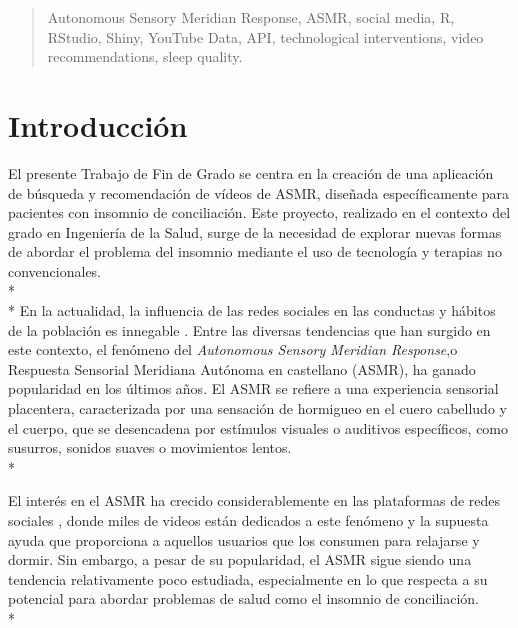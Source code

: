 \documentclass[a4paper,12pt,twoside]{memoir}
\begin{document}
\renewcommand*\abstractname{Keywords}
\begin{abstract}
Autonomous Sensory Meridian Response, ASMR, social media, R, RStudio, Shiny, YouTube Data, API, technological interventions, video recommendations, sleep quality.
\end{abstract}

\clearpage

\tableofcontents

\clearpage

\listoffigures

\clearpage

\listoftables
\clearpage


\mainmatter








\chapter{Introducción}

El presente Trabajo de Fin de Grado se centra en la creación de una aplicación de búsqueda y recomendación de vídeos de ASMR, diseñada específicamente para pacientes con insomnio de conciliación. Este proyecto, realizado en el contexto del grado en Ingeniería de la Salud, surge de la necesidad de explorar nuevas formas de abordar el problema del insomnio mediante el uso de tecnología y terapias no convencionales.\\*\\*
En la actualidad, la influencia de las redes sociales en las conductas y hábitos de la población es innegable \cite{levenson2016}. Entre las diversas tendencias que han surgido en este contexto, el fenómeno del \textit{Autonomous Sensory Meridian Response},o Respuesta Sensorial Meridiana Autónoma en castellano (ASMR), ha ganado popularidad en los últimos años. El ASMR se refiere a una experiencia sensorial placentera, caracterizada por una sensación de hormigueo en el cuero cabelludo y el cuerpo, que se desencadena por estímulos visuales o auditivos específicos, como susurros, sonidos suaves o movimientos lentos. \\*

El interés en el ASMR ha crecido considerablemente en las plataformas de redes sociales \cite{jerez-2023}, donde miles de videos están dedicados a este fenómeno y la supuesta ayuda que proporciona a aquellos usuarios que los consumen para relajarse y dormir. Sin embargo, a pesar de su popularidad, el ASMR sigue siendo una tendencia relativamente poco estudiada, especialmente en lo que respecta a su potencial para abordar problemas de salud como el insomnio de conciliación.\\*
\end{document}
